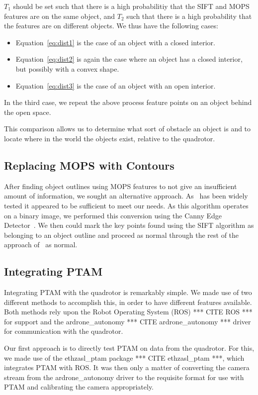 \documentclass{acmsiggraph}
\begin{document}
$T_1$ should be set such that there is a high probabilitiy that the SIFT and MOPS features are on the same object, and $T_2$ such that there is a high probability that the features are on different objects. We thus have the following cases:
\begin{itemize}
\item Equation~\ref{eq:dist1} is the case of an object with a closed interior.
\item Equation~\ref{eq:dist2} is again the case where an object has a closed interior, but possibly with a convex shape.
\item Equation~\ref{eq:dist3} is the case of an object with an open interior.
\end{itemize}
In the third case, we repeat the above process feature points on an object behind the open space.

This comparison allows us to determine what sort of obstacle an object is and to locate where in the world the objects exist, relative to the quadrotor.

\subsection{Replacing MOPS with Contours}
After finding object outlines using MOPS features to not give an insufficient amount of information, we sought an 
alternative approach.  As~\cite{suzuki1985} has been widely tested it appeared to be sufficient to meet our needs.  
As this algorithm operates on a binary image, we performed this conversion using the Canny Edge Detector~\cite{canny1986}.
We then could mark the key points found using the SIFT algorithm as belonging to an object outline and proceed as normal 
through the rest of the approach of~\cite{lee2011} as normal.

\subsection{Integrating PTAM}
Integrating PTAM with the quadrotor is remarkably simple. We made use of two different methods to accomplish this, in order to have different features available. Both methods rely upon the Robot Operating System (ROS) *** CITE ROS *** for support and the ardrone\_autonomy *** CITE ardrone\_autonomy *** driver for communication with the quadrotor.

Our first approach is to directly test PTAM on data from the quadrotor. For this, we made use of the ethzasl\_ptam package *** CITE ethzasl\_ptam ***, which integrates PTAM with ROS. It was then only a matter of converting the camera stream from the ardrone\_autonomy driver to the requisite format for use with PTAM and calibrating the camera appropriately.
\end{document}
